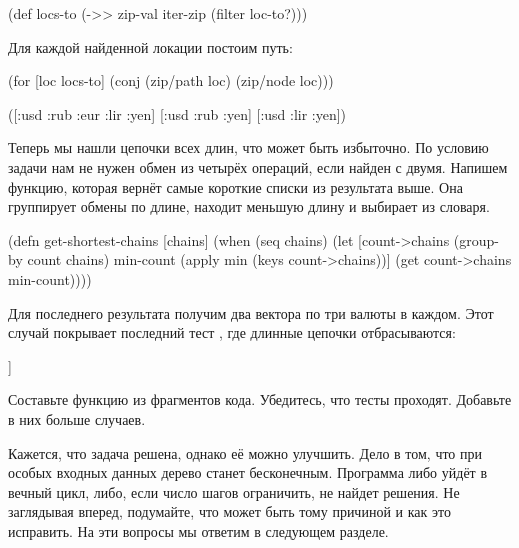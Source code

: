 \begin{english}
  \begin{clojure}
(def locs-to
  (->> zip-val
       iter-zip
       (filter loc-to?)))
  \end{clojure}
\end{english}

Для каждой найденной локации постоим путь:

\begin{english}
  \begin{clojure}
(for [loc locs-to]
  (conj (zip/path loc) (zip/node loc)))

([:usd :rub :eur :lir :yen]
 [:usd :rub :yen]
 [:usd :lir :yen])
  \end{clojure}
\end{english}

Теперь мы нашли цепочки всех длин, что может быть избыточно. По условию задачи
нам не нужен обмен из четырёх операций, если найден с двумя. Напишем функцию,
которая вернёт самые короткие списки из результата выше. Она группирует обмены
по длине, находит меньшую длину и выбирает из словаря.

\begin{english}
  \begin{clojure}
(defn get-shortest-chains
  [chains]
  (when (seq chains)
    (let [count->chains (group-by count chains)
          min-count (apply min (keys count->chains))]
      (get count->chains min-count))))
  \end{clojure}
\end{english}

Для последнего результата получим два вектора по три валюты в каждом. Этот
случай покрывает последний тест , где длинные цепочки
отбрасываются:

\begin{english}
  \begin{clojure}
[[:usd :rub :yen] [:usd :lir :yen]]
  \end{clojure}
\end{english}

Составьте функцию  из фрагментов кода. Убедитесь, что тесты
проходят. Добавьте в них больше случаев.

Кажется, что задача решена, однако её можно улучшить. Дело в том, что при особых
входных данных дерево станет бесконечным. Программа либо уйдёт в вечный цикл,
либо, если число шагов ограничить, не найдет решения. Не заглядывая вперед,
подумайте, что может быть тому причиной и как это исправить. На эти вопросы мы
ответим в следующем разделе.

